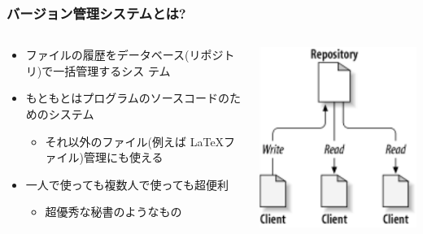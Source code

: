 \begin{frame}
  \frametitle{バージョン管理システムとは?}
  \begin{columns}[T]
    \begin{column}{.7\textwidth}
      \begin{itemize}
        \setlength{\itemsep}{1em}
      \item ファイルの履歴をデータベース(リポジトリ)で一括管理するシス
        テム
      \item もともとはプログラムのソースコードのためのシステム
        \begin{itemize}
        \item それ以外のファイル(例えば \LaTeX ファイル)管理にも使える
        \end{itemize}
      \item 一人で使っても複数人で使っても超便利
        \begin{itemize}
        \item 超優秀な秘書のようなもの
        \end{itemize}
      \end{itemize}
    \end{column}
    \begin{column}{.25\textwidth}
      \includegraphics[width=\textwidth]{ch02dia1.pdf}
    \end{column}
  \end{columns}
\end{frame}

